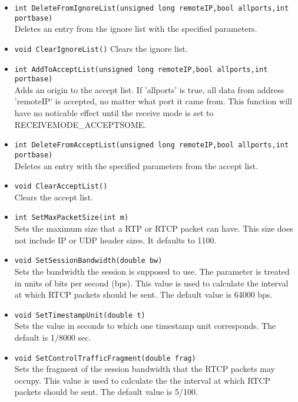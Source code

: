 \begin{itemize}
\item {\tt int DeleteFromIgnoreList(unsigned long remoteIP,bool allports,int portbase)}\\
	Deletes an entry from the ignore list with the specified parameters.
	
\item {\tt void ClearIgnoreList()}
	Clears the ignore list.

\item {\tt int AddToAcceptList(unsigned long remoteIP,bool allports,int portbase)}\\
	Adds an origin to the accept list. If 'allports' is true, all
	data from address 'remoteIP' is accepted, no matter what port it
	came from. This function will have no noticable effect until the
	receive mode is set to RECEIVEMODE\_ACCEPTSOME.

\item {\tt int DeleteFromAcceptList(unsigned long remoteIP,bool allports,int portbase)}\\
	Deletes an entry with the specified parameters from the accept list.

\item {\tt void ClearAcceptList()}\\
	Clears the accept list.

\item {\tt int SetMaxPacketSize(int m)}\\
	Sets the maximum size that a RTP or RTCP packet can have. This size
	does not include IP or UDP header sizes. It defaults to 1100.

\item {\tt void SetSessionBandwidth(double bw)}\\
	Sets the bandwidth the session is supposed to use. The parameter
	is treated in units of bits per second (bps). This value is used to
	calculate the interval at which RTCP packets should be sent. The
	default value is 64000 bps.	
	
\item {\tt void SetTimestampUnit(double t)}\\
	Sets the value in seconds to which one timestamp unit corresponds.
	The default is 1/8000 sec.

\item {\tt void SetControlTrafficFragment(double frag)}\\
	Sets the fragment of the session bandwidth that the RTCP packets
	may occupy. This value is used to calculate the the interval at
	which RTCP packets should be sent. The default value is 5/100.
	

\end{itemize}
